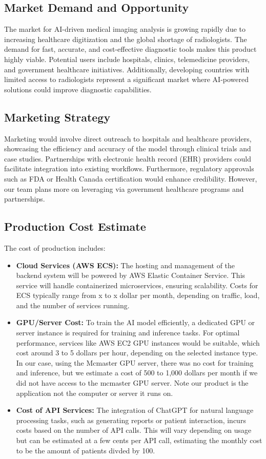 \documentclass{article}
\begin{document}
\subsection{Market Demand and Opportunity}
The market for AI-driven medical imaging analysis is growing rapidly due to increasing healthcare digitization and the global shortage of radiologists. The demand for fast, accurate, and cost-effective diagnostic tools makes this product highly viable. Potential users include hospitals, clinics, telemedicine providers, and government healthcare initiatives. Additionally, developing countries with limited access to radiologists represent a significant market where AI-powered solutions could improve diagnostic capabilities.

\subsection{Marketing Strategy}
Marketing would involve direct outreach to hospitals and healthcare providers, showcasing the efficiency and accuracy of the model through clinical trials and case studies. Partnerships with electronic health record (EHR) providers could facilitate integration into existing workflows. Furthermore, regulatory approvals such as FDA or Health Canada certification would enhance credibility. However, our team plans more on leveraging via government healthcare programs and partnerships.

\subsection{Production Cost Estimate}
The cost of production includes:
\begin{itemize}

    \item \textbf{Cloud Services (AWS ECS):} The hosting and management of the backend system will be powered by AWS Elastic Container Service. This service will handle containerized microservices, ensuring scalability. Costs for ECS typically range from x to x dollar per month, depending on traffic, load, and the number of services running.
    \item \textbf{GPU/Server Cost:} To train the AI model efficiently, a dedicated GPU or server instance is required for training and inference tasks. For optimal performance, services like AWS EC2 GPU instances would be suitable, which cost around 3 to 5 dollars per hour, depending on the selected instance type. In our case, using the Mcmaster GPU server, there was no cost for training and inference, but we estimate a cost of 500 to 1,000 dollars per month if we did not have access to the mcmaster GPU server. Note our product is the application not the computer or server it runs on.
    \item \textbf{Cost of API Services:} The integration of ChatGPT for natural language processing tasks, such as generating reports or patient interaction, incurs costs based on the number of API calls. This will vary depending on usage but can be estimated at a few cents per API call, estimating the monthly cost to be the amount of patients divded by 100. 
\end{itemize}
\end{document}
